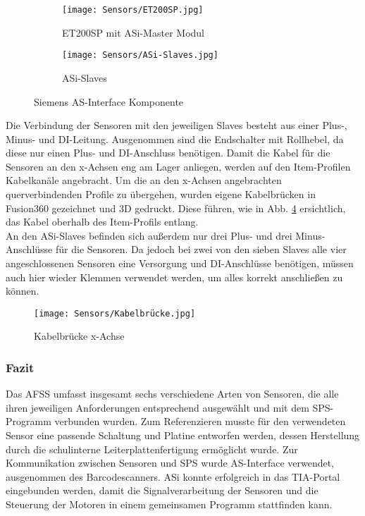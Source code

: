 \begin{figure}[H]
    \centering
    \begin{subfigure}{.4\textwidth}
        \centering
        \texttt{[image: Sensors/ET200SP.jpg]}
        \caption{ET200SP mit ASi-Master Modul}
        \label{ET200SP}
    \end{subfigure}
    \begin{subfigure}{.4\textwidth}
        \centering
        \texttt{[image: Sensors/ASi-Slaves.jpg]}
        \caption{ASi-Slaves}
        \label{ASi-Slaves}
    \end{subfigure}
    \caption{Siemens AS-Interface Komponente}
\end{figure}

Die Verbindung der Sensoren mit den jeweiligen Slaves besteht aus einer Plus-, Minus- und DI-Leitung. Ausgenommen sind die Endschalter mit Rollhebel, da diese nur einen Plus- und DI-Anschluss benötigen. Damit die Kabel für die Sensoren an den x-Achsen eng am Lager anliegen, werden auf den Item-Profilen Kabelkanäle angebracht. Um die an den x-Achsen angebrachten querverbindenden Profile zu übergehen, wurden eigene Kabelbrücken in Fusion360 gezeichnet und 3D gedruckt. Diese führen, wie in Abb. \ref{Kabelbrücke} ersichtlich, das Kabel oberhalb des Item-Profils entlang.\\
An den ASi-Slaves befinden sich außerdem nur drei Plus- und drei Minus-Anschlüsse für die Sensoren. Da jedoch bei zwei von den sieben Slaves alle vier angeschlossenen Sensoren eine Versorgung und DI-Anschlüsse benötigen, müssen auch hier wieder Klemmen verwendet werden, um alles korrekt anschließen zu können.

\begin{figure}[H]
    \centering
    \texttt{[image: Sensors/Kabelbrücke.jpg]}
    \caption{Kabelbrücke x-Achse}
    \label{Kabelbrücke}
\end{figure}

\subsubsection{Fazit}
Das AFSS umfasst insgesamt sechs verschiedene Arten von Sensoren, die alle ihren jeweiligen Anforderungen entsprechend ausgewählt und mit dem SPS-Programm verbunden wurden. Zum Referenzieren musste für den verwendeten Sensor eine passende Schaltung und Platine entworfen werden, dessen Herstellung durch die schulinterne Leiterplattenfertigung ermöglicht wurde. Zur Kommunikation zwischen Sensoren und SPS wurde AS-Interface verwendet, ausgenommen des Barcodescanners. ASi konnte erfolgreich in das TIA-Portal eingebunden werden, damit die Signalverarbeitung der Sensoren und die Steuerung der Motoren in einem gemeinsamen Programm stattfinden kann.

